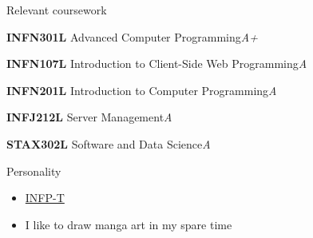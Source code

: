 \documentclass{resume} %
\begin{document}

\begin{rSection}{Relevant coursework}
\vspace{-1.25em}
\item \textbf{INFN301L} {Advanced Computer Programming}\hfill \textit{A+}
\item \textbf{INFN107L} {Introduction to Client-Side Web Programming}\hfill \textit{A}
\item \textbf{INFN201L} {Introduction to Computer Programming}\hfill \textit{A}
\item \textbf{INFJ212L} {Server Management}\hfill \textit{A}
\item \textbf{STAX302L} {Software and Data Science}\hfill \textit{A}
\end{rSection} 




\begin{rSection}{Personality} 
\begin{itemize}
    \item \href{https://www.16personalities.com/infp-personality}{INFP-T}\item{I like to draw manga art in my spare time}
\end{itemize}


\end{rSection}
\end{document}
